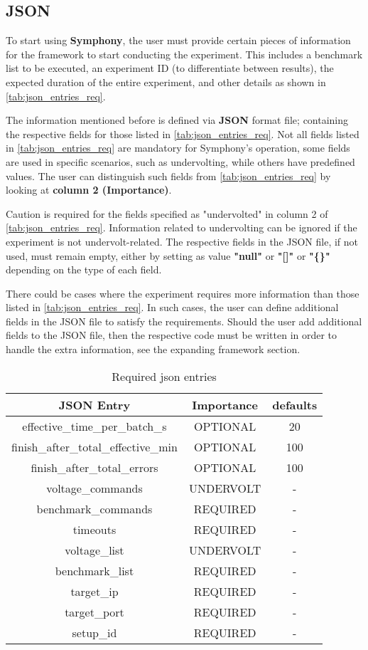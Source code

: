 \subsection{JSON}
To start using \textbf{Symphony}, the user must provide certain pieces of information for the framework to start conducting the experiment. This includes a benchmark list to be executed, an experiment ID (to differentiate between results), the expected duration of the entire experiment, and other details as shown in \autoref{tab:json_entries_req}. 

The information mentioned before is defined via \textbf{JSON} format file; containing the respective fields for those listed in \autoref{tab:json_entries_req}. Not all fields listed in \autoref{tab:json_entries_req} are mandatory for Symphony's operation, some fields are used in specific scenarios, such as undervolting, while others have predefined values. The user can distinguish such fields from \autoref{tab:json_entries_req} by looking at \textbf{column 2 (Importance)}. 

Caution is required for the fields specified as "undervolted" in column 2 of \autoref{tab:json_entries_req}. Information related to undervolting can be ignored if the experiment is not undervolt-related. The respective fields in the JSON file, if not used, must remain empty, either by setting as value \textbf{"null"} or \textbf{"[]"} or \textbf{"\{\}"} depending on the type of each field.

There could be cases where the experiment requires more information than those listed in \autoref{tab:json_entries_req}. In such cases, the user can define additional fields in the JSON file to satisfy the requirements. Should the user add additional fields to the JSON file, then the respective code must be written in order to handle the extra information, see the expanding framework section.

\begin{table}[h!]
\begin{center}
\begin{tabular}{ |c|c|c| } 
\hline
JSON Entry & Importance & defaults \\
\hline
effective\_time\_per\_batch\_s & OPTIONAL & 20 \\ 
finish\_after\_total\_effective\_min & OPTIONAL & 100 \\ 
finish\_after\_total\_errors & OPTIONAL & 100 \\
voltage\_commands & UNDERVOLT & - \\
benchmark\_commands & REQUIRED & - \\
timeouts & REQUIRED & - \\ 
voltage\_list & UNDERVOLT & - \\
benchmark\_list & REQUIRED & - \\
target\_ip & REQUIRED & - \\
target\_port & REQUIRED & - \\
setup\_id & REQUIRED & - \\

\hline
\end{tabular}
\caption{Required json entries}
\label{tab:json_entries_req}
\end{center}
\end{table}
\newpage
